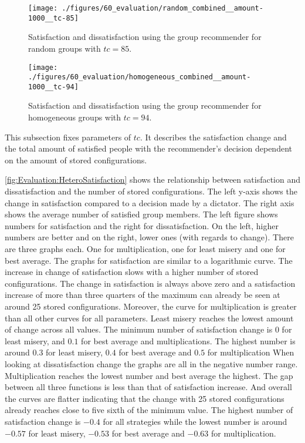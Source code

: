 \begin{figure}[p]
    \centering
    \texttt{[image: ./figures/60\_evaluation/random\_combined\_\_amount-1000\_\_tc-85]}
    \caption[Satisfaction and Dissatisfaction: Random Groups]{Satisfaction and dissatisfaction using the group recommender for random groups with $tc = 85$.}
    \label{fig:Evaluation:RandomSatisfaction}
\end{figure}

\begin{figure}[p]
    \centering
    \texttt{[image: ./figures/60\_evaluation/homogeneous\_combined\_\_amount-1000\_\_tc-94]}
    \caption[Satisfaction and Dissatisfaction: Homogeneous Groups]{Satisfaction and dissatisfaction using the group recommender for homogeneous groups with $tc = 94$.}
    \label{fig:Evaluation:HomoSatisfaction}
\end{figure}

This subsection fixes parameters of $tc$. It describes the satisfaction change and the total amount of satisfied people with the recommender's decision dependent on the amount of stored configurations.

\autoref{fig:Evaluation:HeteroSatisfaction} shows the relationship between satisfaction and dissatisfaction and the number of stored configurations. The left y-axis shows the change in satisfaction compared to a decision made by a dictator. The right axis shows the average number of satisfied group members. The left figure shows numbers for satisfaction and the right for dissatisfaction. On the left, higher numbers are better and on the right, lower ones (with regards to change). There are three graphs each. One for multiplication, one for least misery and one for best average. The graphs for satisfaction are similar to a logarithmic curve. The increase in change of satisfaction slows with a higher number of stored configurations. The change in satisfaction is always above zero and a satisfaction increase of more than three quarters of the maximum can already be seen at around 25 stored configurations. Moreover, the curve for multiplication is greater than all other curves for all parameters. Least misery reaches the lowest amount of change across all values. The minimum number of satisfaction change is $0$ for least misery, and $0.1$ for best average and multiplications. The highest number is around $0.3$ for least misery, $0.4$ for best average and $0.5$ for multiplication
When looking at dissatisfaction change the graphs are all in the negative number range. Multiplication reaches the lowest number and best average the highest. The gap between all three functions is less than that of satisfaction increase. And overall the curves are flatter indicating that the change with 25 stored configurations already reaches close to five sixth of the minimum value. The highest number of satisfaction change is $-0.4$ for all strategies while the lowest number is around $-0.57$ for least misery, $-0.53$ for best average and $-0.63$ for multiplication.

